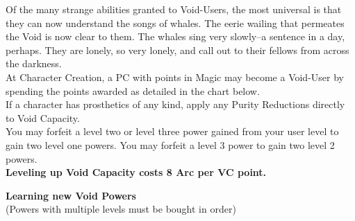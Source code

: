 \documentclass[a4paper, twocolumn, openany]{book}
\begin{document}
{Of the many strange abilities granted to Void-Users, the most universal is that they can now
understand the songs of whales. The eerie wailing that permeates the Void is now clear to
them. The whales sing very slowly--a sentence in a day, perhaps. They are lonely, so very
lonely, and call out to their fellows from across the darkness.\\

At Character Creation, a PC with points in Magic may become a Void-User by spending the
points awarded as detailed in the chart below.\\

If a character has prosthetics of any kind, apply any Purity Reductions directly to Void Capacity.\\

You may forfeit a level two or level three power gained from your user level to gain two level one
powers. You may forfeit a level 3 power to gain two level 2 powers.\\

{\bfseries Leveling up Void Capacity costs 8 Arc per VC point.\\}

{\bfseries Learning new Void Powers\\}
(Powers with multiple levels must be bought in order)\\


}
\end{document}
